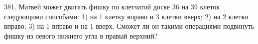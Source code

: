 381. Матвей может двигать фишку по клетчатой доске 36 на 39 клеток следующими способами:
1) на 1 клетку вправо и 3 клетки вверх; 2) на 2 клетки вправо; 3) на 1 вправо и на 1 вверх.
Сможет ли он такими операциями подвинуть фишку из левого нижнего угла в правый верхний?\\
